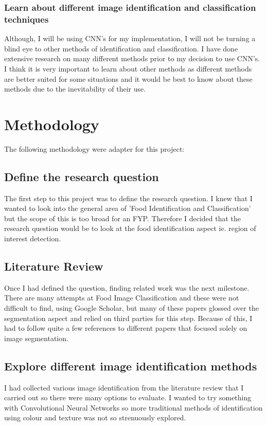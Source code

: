 \subsubsection{Learn about different image identification and classification techniques}
Although, I will be using CNN's for my implementation, I will not be turning a
blind eye to other methods of identification and classification.
I have done extensive research on many different methods prior to my decision to use CNN's.
I think it is very important to learn about other methods as different methods
are better suited for some situations and it would be best to know about these methods due to the inevitability of their use.

\section{Methodology}
The following methodology were adapter for this project:

\subsection{ Define the research question}
The first step to this project was to define the research question.
I knew that I wanted to look into the general area of 'Food Identification and
Classification' but the scope of this is too broad for an FYP.
Therefore I decided that the research question would be to look at the food identification aspect ie. region of interest detection.

\subsection{ Literature Review}
Once I had defined the question, finding related work was the next milestone.
There are many attempts at Food Image Classification and these were not difficult to find, using Google Scholar, but many of these papers glossed over the segmentation aspect and relied on third parties for this step.
Because of this, I had to follow quite a few references to different papers that focused solely on image segmentation.

\subsection{ Explore different image identification methods}
I had collected various image identification from the literature review that I carried out so there were many options to evaluate.
I wanted to try something with Convolutional Neural Networks so more traditional
methods of identification using colour and texture was not so strenuously explored.

